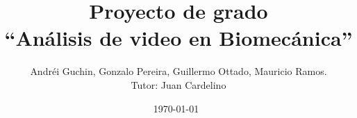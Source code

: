 \documentclass[11pt,a4paper,titlepage,spanish]{article}
\title{Proyecto de grado\\ ``Análisis de video en Biomecánica''}
\author{Andréi Guchin, Gonzalo Pereira, Guillermo Ottado, Mauricio Ramos. \\
Tutor: Juan Cardelino}
\date{\today~\currenttime}
\begin{document}
\maketitle

\newpage
\tableofcontents
\newpage

\begin{abstract}
\begin{center}
\begin{minipage}{.8\textwidth}

\end{minipage}
\end{center}
\end{abstract}

\newpage\null\thispagestyle{empty}\newpage

\clearpage
\vspace*{\fill}
\begin{center}
\begin{minipage}{.8\textwidth}

\end{minipage}
\end{center}
\vfill %

\newpage\null\thispagestyle{empty}\newpage


\clearpage

\clearpage

\clearpage

\clearpage

\clearpage

\clearpage

\clearpage

\clearpage

\clearpage

%
\clearpage

\clearpage

\clearpage

\clearpage

\clearpage


\nocite{*} %


\end{document}
